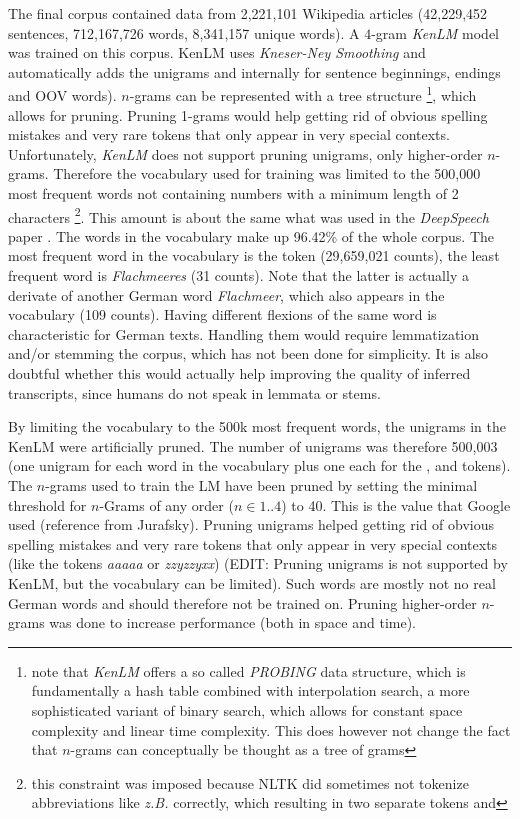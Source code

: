 The final corpus contained data from 2,221,101 Wikipedia articles (42,229,452 sentences, 712,167,726 words, 8,341,157 unique words). A $4$-gram \textit{KenLM} model was trained on this corpus. KenLM uses \textit{Kneser-Ney Smoothing} and automatically adds the unigrams  and  internally for sentence beginnings, endings and \ac{OOV} words). $n$-grams can be represented with a tree structure \footnote{note that \textit{KenLM} offers a so called \textit{PROBING} data structure, which is fundamentally a hash table combined with interpolation search, a more sophisticated variant of binary search, which allows for constant space complexity and linear time complexity. This does however not change the fact that $n$-grams can conceptually be thought as a tree of grams}, which allows for pruning. Pruning 1-grams would help getting rid of obvious spelling mistakes and very rare tokens that only appear in very special contexts. Unfortunately, \textit{KenLM} does not support pruning unigrams, only higher-order $n$-grams. Therefore the vocabulary used for training was limited to the 500,000 most frequent words not containing numbers with a minimum length of 2 characters \footnote{this constraint was imposed because NLTK did sometimes not tokenize abbreviations like \textit{z.B.} correctly, which resulting in two separate tokens  and }. This amount is about the same what was used in the \textit{DeepSpeech} paper \parencite{deepspeech}. The words in the vocabulary make up 96.42\% of the whole corpus. The most frequent word in the vocabulary is the  token (29,659,021 counts), the least frequent word is \textit{Flachmeeres} (31 counts). Note that the latter is actually a derivate of another German word \textit{Flachmeer}, which also appears in the vocabulary (109 counts). Having different flexions of the same word is characteristic for German texts. Handling them would require lemmatization and/or stemming the corpus, which has not been done for simplicity. It is also doubtful whether this would actually help improving the quality of inferred transcripts, since humans do not speak in lemmata or stems.

By limiting the vocabulary to the 500k most frequent words, the unigrams in the KenLM were artificially pruned. The number of unigrams was therefore 500,003 (one unigram for each word in the vocabulary plus one each for the ,  and  tokens). The $n$-grams used to train the \ac{LM} have been pruned by setting the minimal threshold for $n$-Grams of any order ($n \in 1..4$) to 40. This is the value that Google used (reference from Jurafsky). Pruning unigrams helped getting rid of obvious spelling mistakes and very rare tokens that only appear in very special contexts (like the tokens \textit{aaaaa} or \textit{zzyzzyxx}) (EDIT: Pruning unigrams is not supported by KenLM, but the vocabulary can be limited). Such words are mostly not no real German words and should therefore not be trained on. Pruning higher-order $n$-grams was done to increase performance (both in space and time).

